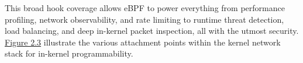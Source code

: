 \documentclass [11pt, proquest] {uwthesis}[2020/02/24]
\begin{document}
This broad hook coverage allows eBPF to power everything from performance profiling, network observability, and rate limiting to runtime threat detection, load balancing, and deep in-kernel packet inspection, all with the utmost security. \hyperref[sec:ebpf-hooks-kernel-network-datapath]{Figure 2.3} illustrate the various attachment points within the kernel network stack for in-kernel programmability.


\end{document}
